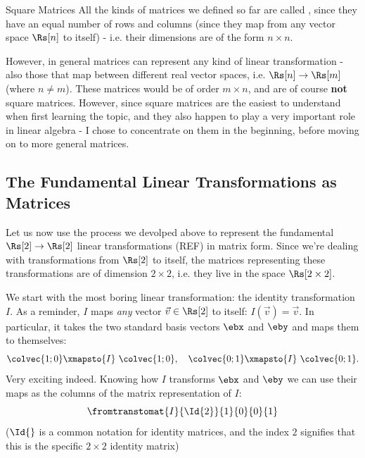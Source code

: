 \begin{note}{Square Matrices}{}
	All the kinds of matrices we defined so far are called , since they have an equal number of rows and columns (since they map from any vector space $\Rs[n]$ to itself) - i.e. their dimensions are of the form $n\times n$.

	\vspace{1em}
	However, in general matrices can represent any kind of linear transformation - also those that map between different real vector spaces, i.e. $\Rs[n]\to\Rs[m]$ (where $n\neq m$). These matrices would be of order $m\times n$, and are of course \textbf{not} square matrices. However, since square matrices are the easiest to understand when first learning the topic, and they also happen to play a very important role in linear algebra - I chose to concentrate on them in the beginning, before moving on to more general matrices.
\end{note}

\subsection{The Fundamental Linear Transformations as Matrices}
Let us now use the process we devolped above to represent the fundamental $\Rs[2]\to\Rs[2]$ linear transformations (REF) in matrix form. Since we're dealing with transformations from $\Rs[2]$ to itself, the matrices representing these transformations are of dimension $2\times2$, i.e. they live in the space $\Rs[2\times2]$.

We start with the most boring linear transformation: the identity transformation $I$. As a reminder, $I$ maps \textit{any} vector $\vec{v}\in\Rs[2]$ to itself: $I(\vec{v})=\vec{v}$. In particular, it takes the two standard basis vectors $\ebx$ and $\eby$ and maps them to themselves:
\begin{equation}
	\colvec{1;0} \xmapsto{I}\ \colvec{1;0},\quad \colvec{0;1} \xmapsto{I}\ \colvec{0;1}.
	\label{eq:}
\end{equation}
Very exciting indeed. Knowing how $I$ transforms $\ebx$ and $\eby$ we can use their maps as the columns of the matrix representation of $I$:
\begin{equation}
	\fromtranstomat{I}{\Id{2}}{1}{0}{0}{1}
	\label{eq:the 2-by-2 identity matrix}
\end{equation}
($\Id{}$ is a common notation for identity matrices, and the index $2$ signifies that this is the specific $2\times2$ identity matrix)

